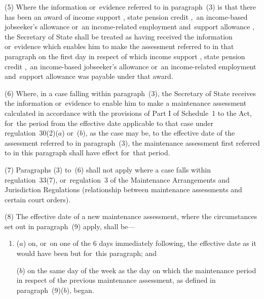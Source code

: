 \documentclass[a4paper,12pt]{article}
\begin{document}
(5) Where the information or~evidence referred to in paragraph~(3) is that there has been an award of income support%
, state pension credit%
,~an income-based jobseeker’s allowance or~an income-related employment and~support allowance%
, the Secretary of State shall be treated as having received the information or~evidence which enables 
him  %
to make the assessment referred to in that paragraph on the first day in respect of which income support%
, state pension credit%
,~an income-based jobseeker’s allowance or~an income-related employment and~support allowance  %
was payable under that award.

(6) Where, in a case falling within paragraph~(3), 
the Secretary of State  %
receives the information or~evidence to enable him to make a maintenance assessment calculated in accordance with the provisions of Part I of Schedule~1 to the Act, for~the period from the effective date applicable to that case under regulation~30(2)($a$) or~($b$), as the case may be, to the effective date of the assessment referred to in paragraph~(3), the maintenance assessment first referred to in this paragraph shall have effect for~that period.

(7) Paragraphs (3) to~(6) shall not apply where a case falls within regulation~33(7), or~regulation~3 of the Maintenance Arrangements and Jurisdiction Regulations (relationship between maintenance assessments and certain court orders).

(8) The effective date of a new maintenance assessment, where the circumstances set out in paragraph~(9) apply, shall be—
\begin{enumerate}\item[]
($a$) on, or~on one of the 6 days immediately following, the effective date as it would have been but for~this paragraph; and

($b$) on the same day of the week as the day on which the maintenance period in respect of the previous maintenance assessment, as defined in paragraph~(9)($b$), began.
\end{enumerate}
\end{document}
